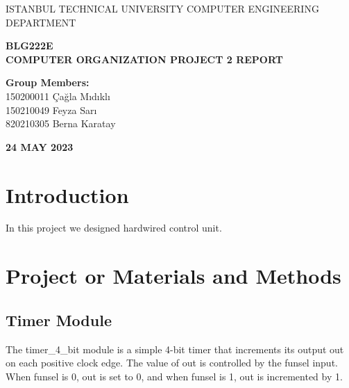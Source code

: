 \documentclass[16pt]{article}
\begin{document}
\begin{titlepage}
  \begin{center}
  
\vspace*{0.5cm} 
  \Large{ISTANBUL TECHNICAL UNIVERSITY
COMPUTER ENGINEERING DEPARTMENT}

\vspace{2cm}
  \huge{\textbf{BLG222E}}\\
  \huge{\textbf{COMPUTER ORGANIZATION PROJECT 2 REPORT}}

\vspace{3cm}
  \Large{\textbf{Group Members:}}\\
  150200011 Çağla Mıdıklı\\
  150210049 Feyza Sarı\\
  820210305 Berna Karatay 
  
\vfill
  \Large{\textbf{24 MAY 2023}}  
  
  \end{center}

  \end{titlepage}

\tableofcontents
\thispagestyle{empty}  
\clearpage
\setcounter{page}{1}

\section{Introduction}
In this project we designed hardwired control unit.


\section{Project or Materials and Methods}
\subsection{Timer Module}
The timer\_4\_bit module is a simple 4-bit timer that increments its output out on each positive clock edge. The value of out is controlled by the funsel input. When funsel is 0, out is set to 0, and when funsel is 1, out is incremented by 1.
\end{document}
